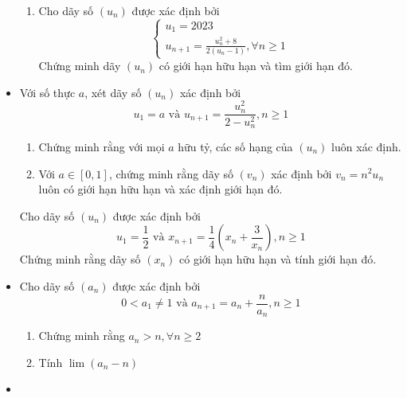 \documentclass[11pt]{scrartcl}
\begin{document}
\begin{itemize}[label=, leftmargin=0em, itemsep=0.5em]
\begin{btvn}
\begin{enumerate}
            \item Cho dãy số $(u_n)$ được xác định bởi
            \[\left\{
                \begin{array}{l}
                    u_1 = 2023\\
                    u_{n + 1} = \frac{u_n^2 + 8}{2(u_n - 1)}, \forall n \geq 1
                \end{array}
            \right.
            \]
            Chứng minh dãy $(u_n)$ có giới hạn hữu hạn và tìm giới hạn đó.
        \end{enumerate}
    \end{btvn}
    \item \begin{btvn} Với số thực $a$, xét dãy số $(u_n)$ xác định bởi
    \[
        u_1 = a \text{ và } u_{n + 1} = \frac{u_n^2}{2 - u_n^2}, n \geq 1
    \]
    \begin{enumerate}
        \item Chứng minh rằng với mọi $a$ hữu tỷ, các số hạng của $(u_n)$ luôn xác định.
        \item Với $a \in [0,1]$, chứng minh rằng dãy số $(v_n)$ xác định bởi $v_n = n^2 u_n$ luôn có giới hạn hữu hạn và xác định giới hạn đó.
    \end{enumerate}
    \end{btvn}
    \begin{btvn} Cho dãy số $(u_n)$ được xác định bởi
        \[
            u_1 = \frac{1}{2} \text{ và } x_{n + 1} = \frac{1}{4} \left(x_n + \frac{3}{x_n}\right), n \geq 1
        \]
    Chứng minh rằng dãy số $(x_n)$ có giới hạn hữu hạn và tính giới hạn đó.
    \end{btvn}
    \item \begin{btvn}
        Cho dãy số $(a_n)$ được xác định bởi
        \[
            0 < a_1 \neq 1 \text{ và } a_{n + 1} = a_n + \frac{n}{a_n}, n \geq 1 
        \]
        \begin{enumerate}[label=(\alph*)]
            \item Chứng minh rằng $a_n > n, \forall n \geq 2$
            \item Tính $\lim (a_n - n)$
        \end{enumerate}
    \end{btvn}
    \item \begin{btvn}

\end{btvn}
\end{itemize}
\end{document}

